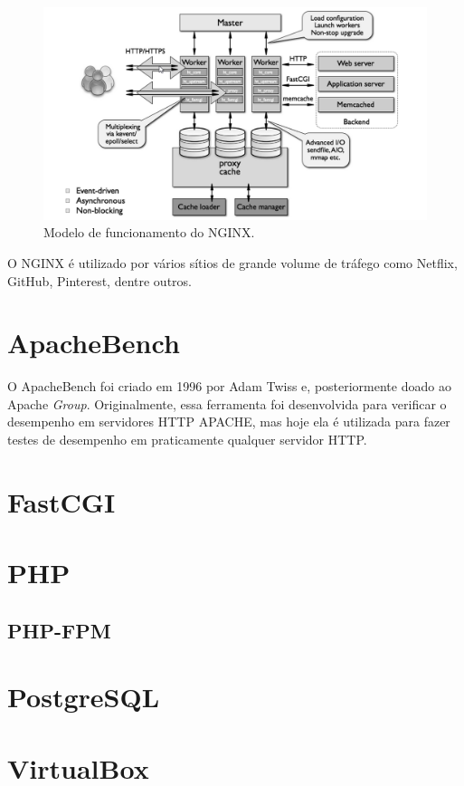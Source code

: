 \begin{figure}
\centering
\includegraphics[scale=1]{figuras/nginx-how-it-works} 
\caption{Modelo de funcionamento do NGINX.}
\label{fig:nginx-comofunciona}
\end{figure}

O NGINX é utilizado por vários sítios de grande volume de tráfego como Netflix, GitHub, Pinterest, dentre outros.\\

\section{ApacheBench}
O ApacheBench foi criado em 1996 por Adam Twiss e, posteriormente doado ao Apache \textit{Group}. Originalmente, essa ferramenta foi desenvolvida para verificar o desempenho em servidores HTTP APACHE, mas hoje ela é utilizada para fazer testes de desempenho em  praticamente qualquer servidor HTTP.

\section{FastCGI}

\section{PHP}
\subsection{PHP-FPM}

\section{PostgreSQL}

\section{VirtualBox}

